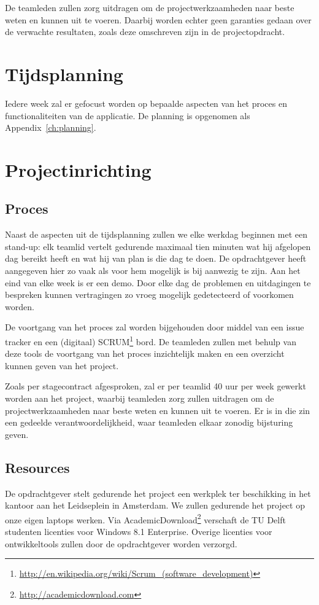 De teamleden zullen zorg uitdragen om de projectwerkzaamheden naar beste weten en kunnen uit te voeren. Daarbij worden echter geen garanties gedaan over de verwachte resultaten, zoals deze omschreven zijn in de projectopdracht.

\section{Tijdsplanning}
Iedere week zal er gefocust worden op bepaalde aspecten van het proces en functionaliteiten van de applicatie. De planning is opgenomen als Appendix~\ref{ch:planning}.

\section{Projectinrichting}

\subsection{Proces}
Naast de aspecten uit de tijdsplanning zullen we elke werkdag beginnen met een stand-up: elk teamlid vertelt gedurende maximaal tien minuten wat hij afgelopen dag bereikt heeft en wat hij van plan is die dag te doen. De opdrachtgever heeft aangegeven hier zo vaak als voor hem mogelijk is bij aanwezig te zijn. Aan het eind van elke week is er een demo. Door elke dag de problemen en uitdagingen te bespreken kunnen vertragingen zo vroeg mogelijk gedetecteerd of voorkomen worden. 

De voortgang van het proces zal worden bijgehouden door middel van een issue tracker en een (digitaal) SCRUM\footnote{\url{http://en.wikipedia.org/wiki/Scrum_(software_development)}} bord. De teamleden zullen met behulp van deze tools de voortgang van het proces inzichtelijk maken en een overzicht kunnen geven van het project.

Zoals per stagecontract afgesproken, zal er per teamlid 40 uur per week gewerkt worden aan het project, waarbij teamleden zorg zullen uitdragen om de projectwerkzaamheden naar beste weten en kunnen uit te voeren. Er is in die zin een gedeelde verantwoordelijkheid, waar teamleden elkaar zonodig bijsturing geven. 

\subsection{Resources}
De opdrachtgever stelt gedurende het project een werkplek ter beschikking in het kantoor aan het Leidseplein in Amsterdam. We zullen gedurende het project op onze eigen laptops werken. Via AcademicDownload\footnote{\url{http://academicdownload.com}} verschaft de TU Delft studenten licenties voor Windows 8.1 Enterprise. Overige licenties voor ontwikkeltools zullen door de opdrachtgever worden verzorgd.

